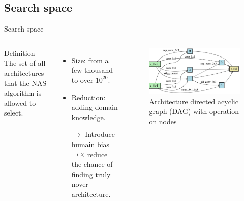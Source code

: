 \documentclass[aspectratio=169,xcolor=dvipsnames]{beamer}
\newcommand{\xmark}{%
\tikz[scale=0.15] {
    \draw[line width=0.7,line cap=round] (0,0) to [bend left=6] (1,1);
    \draw[line width=0.7,line cap=round] (0.2,0.95) to [bend right=3] (0.8,0.05);
}}
\begin{document}
\subsection{Search space}
\begin{frame}{Search space}
    \begin{columns}[c] %
        \begin{block}{Definition}
            The set of all architectures that the NAS algorithm is allowed to select.
        \end{block}
        \begin{itemize}
            \item Size: from a few thousand to over $ 10^{20} $.
            \item Reduction: adding domain knowledge.
            \item [$\rightarrow$] Introduce humain bias $\rightarrow \xmark $ reduce the chance of finding truly nover architecture.
        \end{itemize}
        \begin{figure}[H]
            \centering
            \includegraphics[width=\textwidth]{architecture.jpg} %
            \caption{Architecture directed acyclic graph (DAG) with operation on nodes}
        \end{figure}
    \end{columns}
\end{frame}
\end{document}
